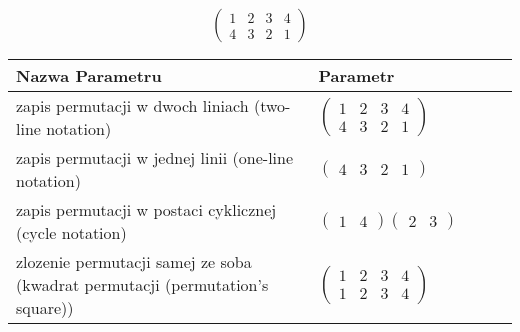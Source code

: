 \documentclass[12pt]{article}
\begin{document}
\subsection{}
\begin{center}
\[
\begin{pmatrix}
	1 & 2 & 3 & 4 \\ 
	4 & 3 & 2 & 1 
\end{pmatrix}
\]

\begin{tabular}{|m{0.6\linewidth}|m{0.4\linewidth}|}
	\hline
	Nazwa Parametru & Parametr \\
	\hline
	zapis permutacji w dwoch liniach (two-line notation) & $\begin{pmatrix} 1 & 2 & 3 & 4 \\ 
4 & 3 & 2 & 1 \end{pmatrix}$ \\ 
	\hline
	zapis permutacji w jednej linii (one-line notation) & $\begin{pmatrix} 4 & 3 & 2 & 1 \end{pmatrix}$ \\ 
	\hline
	zapis permutacji w postaci cyklicznej (cycle notation) & $\begin{pmatrix} 1 & 4 \end{pmatrix} \begin{pmatrix} 2 & 3 \end{pmatrix} $ \\ 
	\hline
	zlozenie permutacji samej ze soba (kwadrat permutacji (permutation's square)) & $\begin{pmatrix} 1 & 2 & 3 & 4 \\ 
1 & 2 & 3 & 4 \end{pmatrix}$ \\ 
	\hline
\end{tabular}
\end{center}
\end{document}
